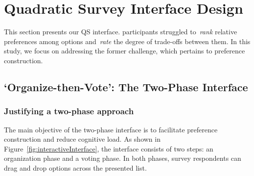 \section{Quadratic Survey Interface Design}
\label{sec:interfaceDesign}
This section presents our QS interface.  participants struggled to~\textit{rank} relative preferences among options and~\textit{rate} the degree of trade-offs between them. In this study, we focus on addressing the former challenge, which pertains to preference construction.

\subsection{`Organize-then-Vote': The Two-Phase Interface}
\label{sec:finalInterfaceDesign}

\subsubsection{Justifying a two-phase approach}
The main objective of the two-phase interface is to facilitate preference construction and reduce cognitive load. As shown in Figure~\ref{fig:interactiveInterface}, the interface consists of two steps: an organization phase and a voting phase. In both phases, survey respondents can drag and drop options across the presented list.

